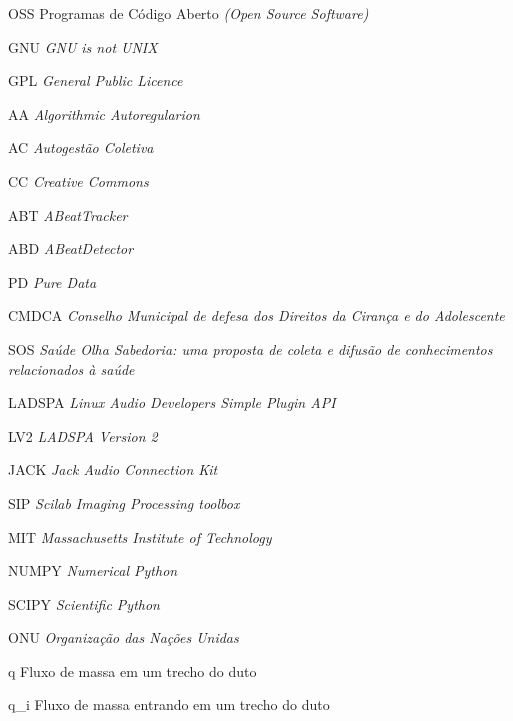 \resumoeabstract %

\listadefiguras %

\listadetabelas %

	\begin{listaespecial}[BIGNAMEWIDTH]
		\item[OSS] Programas de Código Aberto \emph{(Open Source Software)}
		\item[GNU] \emph{GNU is not UNIX}
		\item[GPL] \emph{General Public Licence}
                \item[AA] \emph{Algorithmic Autoregularion}
                \item[AC] \emph{Autogestão Coletiva}
                \item[CC] \emph{Creative Commons}
                \item[ABT] \emph{ABeatTracker}
                \item[ABD] \emph{ABeatDetector}
                \item[PD] \emph{Pure Data}
                \item[CMDCA] \emph{Conselho Municipal de defesa dos Direitos da Cirança e do Adolescente}
                \item[SOS] \emph{Saúde Olha Sabedoria: uma proposta de coleta e difusão de conhecimentos relacionados à saúde}
                \item[LADSPA] \emph{Linux Audio Developers Simple Plugin API}
                \item[LV2] \emph{LADSPA Version 2}
                \item[JACK] \emph{Jack Audio Connection Kit}
                \item[SIP] \emph{Scilab Imaging Processing toolbox}
                \item[MIT] \emph{Massachusetts Institute of Technology}
                \item[NUMPY] \emph{Numerical Python}
                \item[SCIPY] \emph{Scientific Python}
                \item[ONU] \emph{Organização das Nações Unidas}
	\end{listaespecial} 

	\begin{listaespecial}[BIGNAMEWIDTH]
		\item[q] Fluxo de massa em um trecho do duto
		\item[q_i] Fluxo de massa entrando em um trecho do duto
	\end{listaespecial} 

\sumario

